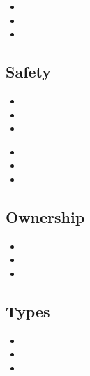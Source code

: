 \documentclass[50pt]{beamer}
\begin{document}
    \begin{frame}
        \begin{itemize}
            \item
            \item
            \item
        \end{itemize}
    \end{frame}

\subsection{Safety}

    \begin{frame}
        \begin{itemize}
            \item
            \item
            \item
        \end{itemize}
    \end{frame}


    \begin{frame}
        \begin{itemize}
            \item
            \item
            \item
        \end{itemize}
    \end{frame}



\subsection{Ownership}

    \begin{frame}
        \begin{itemize}
            \item
            \item
            \item
        \end{itemize}
    \end{frame}


\subsection{Types}

    \begin{frame}
        \begin{itemize}
            \item
            \item
            \item
        \end{itemize}
    \end{frame}
\end{document}
